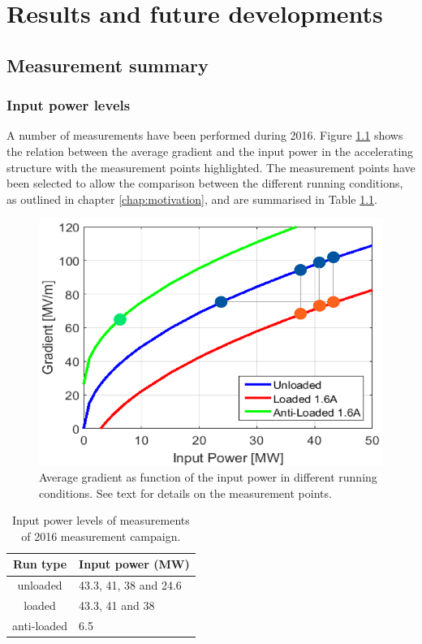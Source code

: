 \chapter[Results and future developments]{Results and future developments}
\label{chap:results}

\section[Measurement  summary]{Measurement summary}

\subsection[Input power levels]{Input power levels}

A number of measurements have been performed during 2016. Figure \ref{g_IP} shows the relation between the average gradient and the input power in the accelerating structure with the measurement points highlighted. The measurement points have been selected to allow the comparison between the different running conditions, as outlined in chapter \ref{chap:motivation}, and are summarised in Table \ref{run_pwr}.

\begin{figure}[h]
\centering 
\includegraphics[scale=0.7]{pictures/grad_vs_inPow.png}
\caption{Average gradient as function of the input power in different running conditions. See text for details on the measurement points. }
\label{g_IP}
\end{figure}



\begin{table}
  \centering
    \begin{tabular}{ c l }
    \toprule
    Run type		&	Input power (MW)		\\
    \midrule
    unloaded 		&	43.3, 41, 38 and 24.6	\\
    loaded			&	43.3, 41 and 38			\\
    anti-loaded		&	6.5					\\
    \bottomrule
    \end{tabular}
\caption{Input power levels of measurements of 2016 measurement campaign.}
\label{run_pwr}
\end{table}

